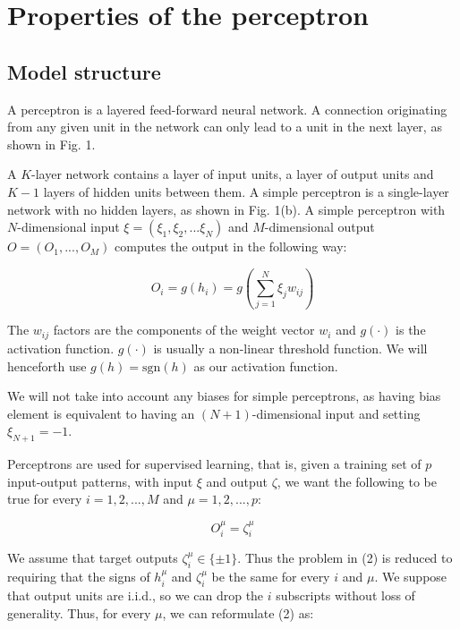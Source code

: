 \section{Properties of the perceptron}

\subsection{Model structure}

A perceptron is a layered feed-forward neural network. A connection originating from any given unit in the network can only lead to a unit in the next layer, as shown in Fig. 1.

A $K$-layer network contains a layer of input units, a layer of output units and $K-1$ layers of hidden units between them. A simple perceptron is a single-layer network with no hidden layers, as shown in Fig. 1(b). A simple perceptron with $N$-dimensional input $\xi = (\xi_1, \xi_2, ... \xi_N)$ and $M$-dimensional output $O = (O_1, ..., O_M)$ computes the output in the following way:

\begin{equation}
    O_i = g(h_i) = g \left( \sum_{j=1}^N \xi_j w_{ij} \right)
\end{equation}

The $w_{ij}$ factors are the components of the weight vector $w_i$ and $g(\cdot)$ is the activation function. $g(\cdot)$ is usually a non-linear threshold function. We will henceforth use $g(h) = \mathrm{sgn} (h)$ as our activation function.

We will not take into account any biases for simple perceptrons, as having bias element is equivalent to having an $(N+1)$-dimensional input and setting $\xi_{N+1} = -1$.

Perceptrons are used for supervised learning, that is, given a training set of $p$ input-output patterns, with input $\xi$ and output $\zeta$, we want the following to be true for every $i = 1, 2, ..., M$ and $\mu = 1, 2, ..., p$:

\begin{equation}
    O_i^\mu = \zeta_i^\mu
\end{equation}

We assume that target outputs $\zeta_i^\mu \in \{ \pm 1 \}$. Thus the problem in (2) is reduced to requiring that the signs of $h_i^\mu$ and $\zeta_i^\mu$ be the same for every $i$ and $\mu$. We suppose that output units are i.i.d., so we can drop the $i$ subscripts without loss of generality. Thus, for every $\mu$, we can reformulate (2) as:

